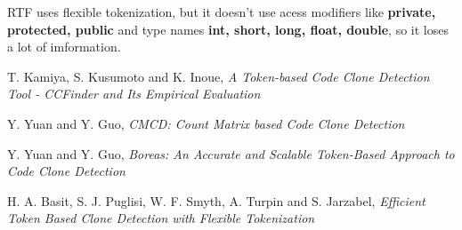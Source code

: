 \documentclass[conference]{IEEEtran}
\begin{document}
RTF uses flexible tokenization, but it doesn't use acess modifiers like \textbf{private, protected, public} and type names \textbf{int, short, long, float, double}, so it loses a lot of imformation.





%
%


\begin{thebibliography}{4}

T. Kamiya, S. Kusumoto and K. Inoue, \emph{A Token-based Code Clone Detection Tool - CCFinder and Its Empirical Evaluation}

Y. Yuan and Y. Guo, \emph{CMCD: Count Matrix based Code Clone Detection}

Y. Yuan and Y. Guo, \emph{Boreas: An Accurate and Scalable Token-Based Approach to Code Clone Detection}

H. A. Basit, S. J. Puglisi, W. F. Smyth, A. Turpin and S. Jarzabel, \emph{Efficient Token Based Clone Detection with Flexible Tokenization}

\end{thebibliography}
\end{document}
